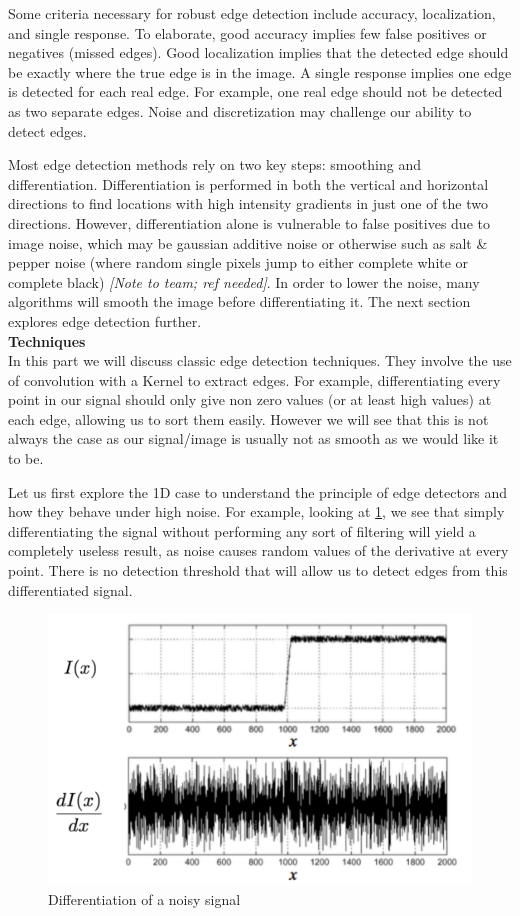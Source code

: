 \documentclass[twoside]{article}
\begin{document}
Some criteria necessary for robust edge detection include accuracy, localization, and single response. To elaborate, good accuracy implies few false positives or negatives (missed edges). Good localization implies that the detected edge should be exactly where the true edge is in the image. A single response implies one edge is detected for each real edge. For example, one real edge should not be detected as two separate edges. Noise and discretization may challenge our ability to detect edges.

Most edge detection methods rely on two key steps: smoothing and differentiation. Differentiation is performed in both the vertical and horizontal directions to find locations with high intensity gradients in just one of the two directions. However, differentiation alone is vulnerable to false positives due to image noise, which may be gaussian additive noise or otherwise such as salt \& pepper noise (where random single pixels jump to either complete white or complete black) \textit{[Note to team; ref needed]}. In order to lower the noise, many algorithms will smooth the image before differentiating it. The next section explores edge detection further. \\

\textbf{Techniques}\\
In this part we will discuss classic edge detection techniques. They involve the use of convolution with a Kernel to extract edges. For example, differentiating every point in our signal should only give non zero values (or at least high values) at each edge, allowing us to sort them easily. However we will see that this is not always the case as our signal/image is usually not as smooth as we would like it to be.

Let us first explore the 1D case to understand the principle of edge detectors and how they behave under high noise. For example, looking at \ref{noisy}, we see that simply differentiating the signal without performing any sort of filtering will yield a completely useless result, as noise causes random values of the derivative at every point. There is no detection threshold that will allow us to detect edges from this differentiated signal.

\begin{figure}[h]
  \centering
  \includegraphics[scale=.4]{noisy_uncorrected.PNG}
    \caption{Differentiation of a noisy signal}
    \label{noisy}
\end{figure}
\end{document}
